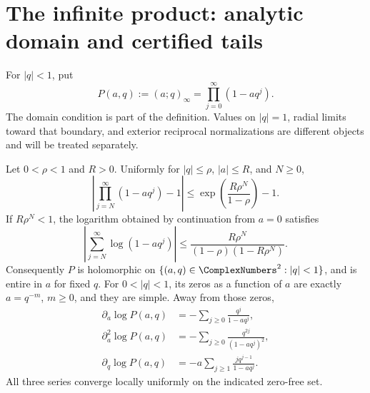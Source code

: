 \section{The infinite product: analytic domain and certified tails}
\label{sec:ip-normal-convergence}
\label{sec:infinite-normal-convergence}

For \(|q|<1\), put
\[
 P(a,q):=(a;q)_\infty=\prod_{j=0}^{\infty}(1-aq^j).
\]
The domain condition is part of the definition.  Values on \(|q|=1\), radial
limits toward that boundary, and exterior reciprocal normalizations are
different objects and will be treated separately.

\begin{theorem}
\label{thm:ip-normal-convergence}
Let \(0<\rho<1\) and \(R>0\).  Uniformly for \(|q|\leq\rho\), \(|a|\leq R\),
and \(N\geq0\),
\begin{equation}
 \left|\prod_{j=N}^{\infty}(1-aq^j)-1\right|
 \leq \exp\left(\frac{R\rho^N}{1-\rho}\right)-1.
 \label{eq:ip-product-tail}
\end{equation}
If \(R\rho^N<1\), the logarithm obtained by continuation from \(a=0\)
satisfies
\begin{equation}
 \left|\sum_{j=N}^{\infty}\log(1-aq^j)\right|
 \leq
 \frac{R\rho^N}{(1-\rho)(1-R\rho^N)}.
 \label{eq:ip-log-tail}
\end{equation}
Consequently \(P\) is holomorphic on
\(\{(a,q)\in\ComplexNumbers^2:|q|<1\}\), and is entire in \(a\) for fixed \(q\).
For \(0<|q|<1\), its zeros as a function of \(a\) are exactly
\(a=q^{-m}\), \(m\geq0\), and they are simple.  Away from those zeros,
\begin{align}
 \partial_a\log P(a,q)
  &=-\sum_{j\geq0}\frac{q^j}{1-aq^j},
  \label{eq:ip-a-logder}\\
 \partial_a^2\log P(a,q)
  &=-\sum_{j\geq0}\frac{q^{2j}}{(1-aq^j)^2},
  \label{eq:ip-a-logsecond}\\
 \partial_q\log P(a,q)
  &=-a\sum_{j\geq1}\frac{j q^{j-1}}{1-aq^j}.
  \label{eq:ip-q-logder}
\end{align}
All three series converge locally uniformly on the indicated zero-free set.
\end{theorem}

